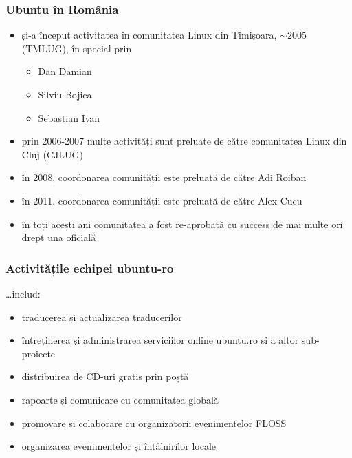 \documentclass[compress]{beamer}
\begin{document}
\begin{frame}
\frametitle{Ubuntu în România}

\begin{itemize}[<+->]
  \item și-a început activitatea în comunitatea Linux din Timișoara, $\sim$2005 (TMLUG), în special prin
    \begin{itemize}[<+->]
      \item Dan Damian
      \item Silviu Bojica
      \item Sebastian Ivan
    \end{itemize}
  \item prin 2006-2007 multe activități sunt preluate de către comunitatea Linux din Cluj (CJLUG)
  \item în 2008, coordonarea comunității este preluată de către Adi Roiban
  \item în 2011. coordonarea comunității este preluată de către Alex Cucu
  \item în toți acești ani comunitatea a fost re-aprobată cu success de mai multe ori drept una oficială
\end{itemize}

\end{frame}

\begin{frame}
\frametitle{Activitățile echipei ubuntu-ro}

\ldots includ:

\begin{itemize}[<+->]
  \item traducerea și actualizarea traducerilor
  \item întreținerea și administrarea serviciilor online ubuntu.ro și a altor sub-proiecte
  \item distribuirea de CD-uri gratis prin poștă
  \item rapoarte și comunicare cu comunitatea globală
  \item promovare si colaborare cu organizatorii evenimentelor FLOSS
  \item organizarea evenimentelor și întâlnirilor locale
\end{itemize}
\end{frame}
\end{document}
